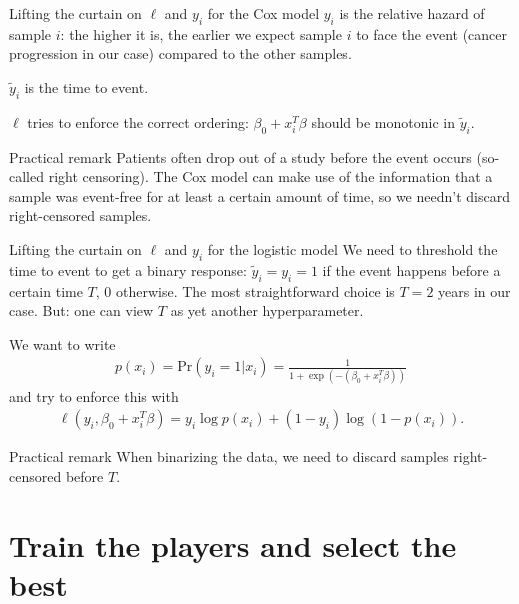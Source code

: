 \documentclass[10pt, aspectratio=169]{beamer}
\def\Pr{\mathrm{Pr}}
\begin{document}
\begin{frame}{Lifting the curtain on $\ell$ and $y_i$ for the \alert{Cox} model}
  $y_i$ is the \alert{relative hazard} of sample $i$: the higher it is, the earlier we 
  expect sample $i$ to face the event (cancer progression in our case) compared to the 
  other samples.

  $\tilde{y}_i$ is the time to event.

  $\ell$ tries to enforce the correct ordering: $\beta_0 + x_i^T \beta$ should be monotonic 
  in $\tilde{y}_i$.

  \begin{alertblock}{Practical remark}
    Patients often drop out of a study before the event occurs (so-called right censoring).
    The Cox model can make use of the information that a sample was event-free for at least 
    a certain amount of time, so we needn't discard right-censored samples.
  \end{alertblock}
\end{frame}

\begin{frame}{Lifting the curtain on $\ell$ and $y_i$ for the \alert{logistic} model}
  We need to \alert{threshold the time to event} to get a \alert{binary response}: 
  $\tilde{y}_i = y_i = 1$ if the event happens before a certain time $T$, $0$ otherwise. 
  The most straightforward choice is $T = 2$ years in our case. But: one can view \alert{$T$} 
  as yet \alert{another hyperparameter}.
  
  We want to write 
  \begin{align}
    p(x_i) = \Pr(y_i=1 | x_i) = \frac{1}{1 + \exp(-(\beta_0 + x_i^T \beta))}
  \end{align}
  and try to enforce this with 
  \begin{align}
    \ell(y_i, \beta_0 + x_i^T \beta) = y_i \log p(x_i) + (1 - y_i) \log(1 - p(x_i)).
  \end{align}

  \begin{alertblock}{Practical remark}
    When binarizing the data, we need to discard samples right-censored before $T$.
  \end{alertblock}
\end{frame}

\section{Train the players and select the best}
\end{document}
